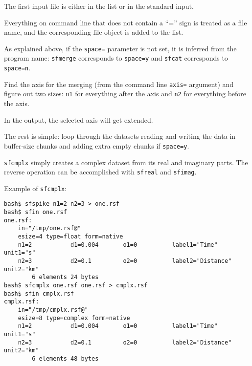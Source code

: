 The first input file is either in the list or in the standard input.

Everything on command line that does not contain a ``='' sign is
treated as a file name, and the corresponding file object is added to the list.

As explained above, if the \texttt{space=} parameter is not set, it is
inferred from the program name: \texttt{sfmerge} corresponds to
\texttt{space=y} and \texttt{sfcat} corresponds to \texttt{space=n}.

Find the axis for the merging (from the command line \texttt{axis=}
argument) and figure out two sizes: \texttt{n1} for everything after
the axis and \texttt{n2} for everything before the axis.

In the output, the selected axis will get extended.

The rest is simple: loop through the datasets reading and writing the
data in buffer-size chunks and adding extra empty chunks if
\texttt{space=y}.

\noindent\doublebox{\parbox{\textwidth}{

}}

\texttt{sfcmplx} simply creates a complex dataset from its real and
imaginary parts. The reverse operation can be accomplished with
\texttt{sfreal} and \texttt{sfimag}.

Example of \texttt{sfcmplx}:
\begin{verbatim}
bash$ sfspike n1=2 n2=3 > one.rsf
bash$ sfin one.rsf
one.rsf:
    in="/tmp/one.rsf@"
    esize=4 type=float form=native
    n1=2           d1=0.004       o1=0          label1="Time" unit1="s"
    n2=3           d2=0.1         o2=0          label2="Distance" unit2="km"
        6 elements 24 bytes
bash$ sfcmplx one.rsf one.rsf > cmplx.rsf
bash$ sfin cmplx.rsf
cmplx.rsf:
    in="/tmp/cmplx.rsf@"
    esize=8 type=complex form=native
    n1=2           d1=0.004       o1=0          label1="Time" unit1="s"
    n2=3           d2=0.1         o2=0          label2="Distance" unit2="km"
        6 elements 48 bytes
\end{verbatim}

\noindent\doublebox{\parbox{\textwidth}{
    
}}

